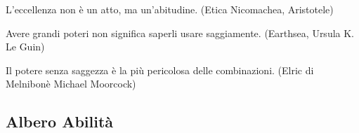 \bigskip

\begin{enfasi}

	L'eccellenza non è un atto, ma un'abitudine. (Etica Nicomachea, Aristotele)

	\medskip

	Avere grandi poteri non significa saperli usare saggiamente. (Earthsea, Ursula K. Le Guin)

	\medskip

	Il potere senza saggezza è la più pericolosa delle combinazioni. (Elric di Melnibonè Michael Moorcock)

\end{enfasi}

\pagebreak


	\subsection{Albero Abilità}


